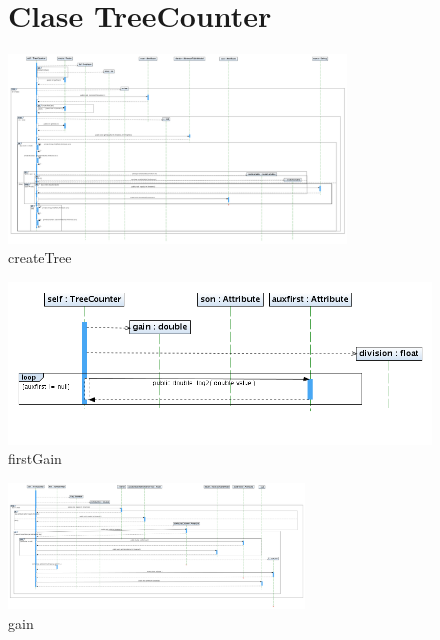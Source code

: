 \documentclass[letterpaper,12pt]{report}
\begin{document}

\begin{figure}
\section{Clase TreeCounter}
\centering
\includegraphics[angle=90, width=0.8\textwidth]{TreeCounter/createTree.png}
\caption{createTree}
\end{figure}
\newpage
\begin{figure}
\centering
\includegraphics[width=1\textwidth]{TreeCounter/gananciaInicial.png}
\caption{firstGain}
\end{figure}
\newpage
\begin{figure}
\centering
\includegraphics[angle=90, width=0.7\textwidth]{TreeCounter/ganancia.png}
\caption{gain}
\end{figure}
\newpage
\end{document}
